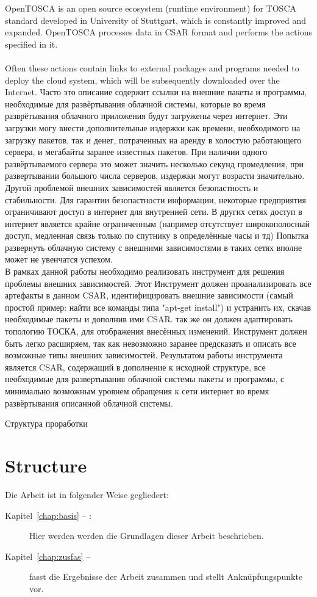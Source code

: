 OpenTOSCA \cite*{OpenTOSCA} is an open source ecosystem (runtime environment) for TOSCA standard developed in University of Stuttgart, which is constantly improved and expanded. OpenTOSCA processes data in CSAR format and performs the actions specified in it.\\\\
Often these actions contain links to external packages and programs needed to deploy the cloud system, which will be subsequently downloaded over the Internet.
 Часто это описание содержит ссылки на внешние пакеты и программы, необходимые для развёртывания облачной системы, которые во время разврётывания облачного приложения будут загружены через интернет. Эти загрузки могу внести дополнительные издержки как времени, необходимого на загрузку пакетов, так и денег, потраченных на аренду в холостую работающего сервера, и мегабайты заранее известных пакетов. При наличии одного развёртываемого сервера это может значить несколько секунд промедления, при развертывании большого числа серверов, издержки могут возрасти значительно.
Другой проблемой внешних зависимостей является безопастность и стабильности. Для гарантии безопастности информации, некоторые предприятия ограничивают доступ в интернет для внутренней сети. В других сетях доступ в интернет является крайне ограниченным (например отсутствует широкополосный доступ, медленная связь только по спутнику в определённые часы и тд) Попытка развернуть облачную систему с внешними зависимостями в таких сетях вполне может не увенчатся успехом.  \\
В рамках данной работы необходимо реализовать инструмент для решения проблемы внешних зависимостей. Этот Инструмент должен проанализировать все артефакты  в данном CSAR, идентифицировать внешние зависимости (самый простой пример: найти все команды типа "apt-get install") и устранить их, скачав необходимые пакеты и дополнив ими CSAR. так же он должен адаптировать топологию ТОСКА, для отображения внесённых изменений. Инструмент должен быть легко расширяем, так как невозможно заранее предсказать и описать все возможные типы внешних зависимостей. Результатом работы инструмента является CSAR, содержащий в дополнение к исходной структуре, все необходимые для развертывания облачной системы пакеты и программы, с минимально возможным уровнем обращения к сети интернет во время развёртывания описанной облачной системы. 
  
Структура проработки
\fi
\section*{Structure}
Die Arbeit ist in folgender Weise gegliedert:
\begin{description}
\item[Kapitel~\ref{chap:basis} -- :] Hier werden werden die Grundlagen dieser Arbeit beschrieben.
\item[Kapitel~\ref{chap:zusfas} -- ] fasst die Ergebnisse der Arbeit zusammen und stellt Anknüpfungspunkte vor.
\end{description}
